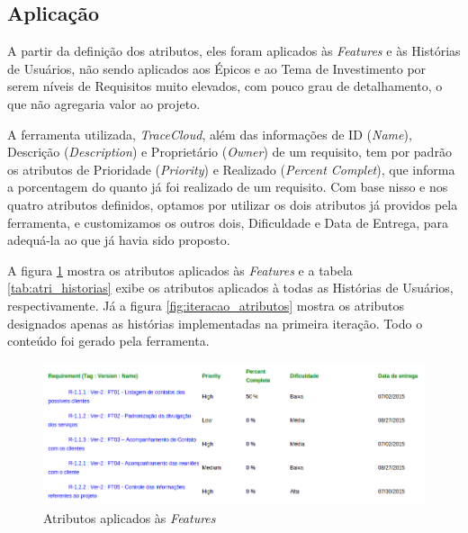 \subsection{Aplicação}

A partir da definição dos atributos, eles foram aplicados às \textit{Features} e às Histórias de Usuários, não sendo aplicados aos Épicos e ao Tema de Investimento por serem níveis de Requisitos muito elevados, com pouco grau de detalhamento, o que não agregaria valor ao projeto.

A ferramenta utilizada, \textit{TraceCloud}\footnotemark, além das informações de ID (\textit{Name}), Descrição (\textit{Description}) e 
Proprietário (\textit{Owner}) de um requisito, tem por padrão os atributos de Prioridade (\textit{Priority}) e Realizado (\textit{Percent Complet}),
que informa a porcentagem do quanto já foi realizado de um requisito. Com base nisso e nos quatro atributos definidos, optamos por utilizar
os dois atributos já providos pela ferramenta, e customizamos os outros dois, Dificuldade e Data de Entrega, para adequá-la ao que já 
havia sido proposto. 


A figura \ref{fig:atri_features} mostra os atributos aplicados às \textit{Features} e a tabela \ref{tab:atri_historias} exibe os atributos aplicados à todas as Histórias de Usuários, respectivamente. Já a figura \ref{fig:iteracao_atributos} mostra os atributos designados apenas as histórias implementadas na primeira iteração. Todo o conteúdo foi gerado pela ferramenta.

\begin{figure}[h]
 \centering
 \includegraphics[width=1\linewidth]{figuras/atributos_features.png}
 \caption{Atributos aplicados às \textit{Features}}
 \label{fig:atri_features}
\end{figure}

